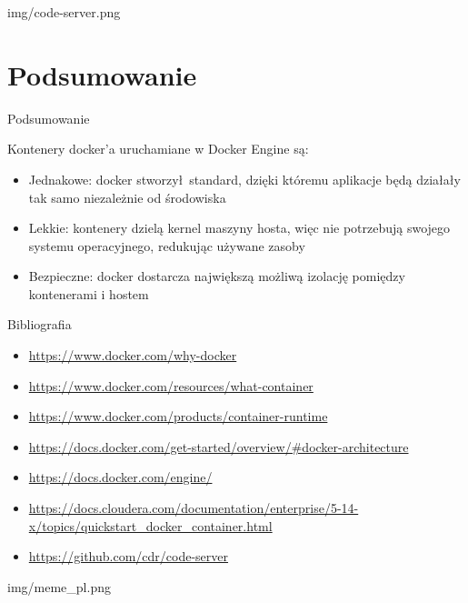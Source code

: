 \documentclass[aspectratio=169]{beamer}
\begin{document}
\begin{frameImg}{img/code-server.png}
\end{frameImg}

\section{Podsumowanie}
\begin{frame}{Podsumowanie}
    \begin{card}
        Kontenery docker'a uruchamiane w Docker Engine są:
        \begin{itemize}
            \item Jednakowe: docker stworzył standard, dzięki któremu aplikacje będą działały tak samo niezależnie od środowiska
            \item Lekkie: kontenery dzielą kernel maszyny hosta, więc nie potrzebują swojego systemu operacyjnego, redukując używane zasoby
            \item Bezpieczne: docker dostarcza największą możliwą izolację pomiędzy kontenerami i hostem
        \end{itemize}
    \end{card}
\end{frame}


\begin{frame}{Bibliografia}
    \begin{card}
        \begin{itemize}
            \item \url{https://www.docker.com/why-docker}
            \item \url{https://www.docker.com/resources/what-container}
            \item \url{https://www.docker.com/products/container-runtime}
            \item \url{https://docs.docker.com/get-started/overview/#docker-architecture}
            \item \url{https://docs.docker.com/engine/}
            \item \url{https://docs.cloudera.com/documentation/enterprise/5-14-x/topics/quickstart_docker_container.html}
            \item \url{https://github.com/cdr/code-server}

        \end{itemize}
    \end{card}

\end{frame}

\begin{frameImg}{img/meme_pl.png}
\end{frameImg}
\end{document}
